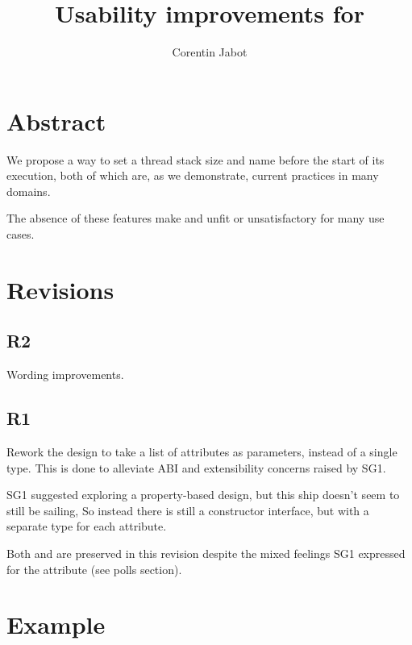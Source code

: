 \documentclass{wg21}
\title{Usability improvements for \tcode{std::thread}}
\author{Corentin Jabot}{corentin.jabot@gmail.com}
\begin{document}
\maketitle

\setlength{\arrayrulewidth}{0.2mm}
\setlength{\tabcolsep}{8pt}
\renewcommand{\arraystretch}{1.}

\def\changemargin#1#2{\list{}{\rightmargin#2\leftmargin#1}\item[]}
\let\endchangemargin=\endlist
\setlength\extrarowheight{5pt}


\section{Abstract}

We propose a way to set a thread stack size and name before the start of its execution, both of which are,
as we demonstrate, current practices in many domains.

The absence of these features make  and  unfit or unsatisfactory for many use cases.

\section{Revisions}

\subsection{R2}

Wording improvements.

\subsection{R1}

Rework the design to take a list of attributes as parameters, instead of a single type.
This is done to alleviate ABI and extensibility concerns raised by SG1.

SG1 suggested exploring a property-based design, but this ship doesn't seem to still be sailing,
So instead there is still a constructor interface, but with a separate type for each attribute.

Both  and  are preserved in this revision despite the
mixed feelings SG1 expressed for the  attribute (see polls section).

\section{Example}
\end{document}
